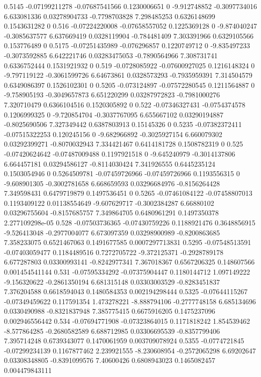 {0.5145 -0.07199211278 -0.07687541566 0.1230006651 0 -9.912748852 -0.3097734016 6.633081336 0.03278904733 -0.7798703828 7.298485253 0.6326148699 0.1543631282 0
0.516 -0.07224220008 -0.07658557052 0.1225369128 0 -9.874040247 -0.3085637577 6.637669419 0.0328119904 -0.784481409 7.303391966 0.6329105566 0.153776489 0
0.5175 -0.07251435989 -0.076296857 0.1220749712 0 -9.835497233 -0.3073592885 6.642221746 0.03283475053 -0.7890564966 7.308731741 0.6336752444 0.1531921932 0
0.519 -0.0728085922 -0.07600927025 0.1216148324 0 -9.797119122 -0.3061599726 6.64673861 0.0328573293 -0.7935959391 7.314504579 0.6349086397 0.1526102301 0
0.5205 -0.073124897 -0.07572280545 0.1211564887 0 -9.758905193 -0.3049657873 6.651220299 0.03287972823 -0.7981000276 7.320710479 0.6366104516 0.1520305892 0
0.522 -0.07346327431 -0.0754374578 0.1206999325 0 -9.720854704 -0.3037767095 6.655667102 0.03290194887 -0.8025690506 7.327349442 0.6387803913 0.15145326 0
0.5235 -0.07382372411 -0.07515322253 0.120245156 0 -9.682966892 -0.3025927154 6.660079302 0.03292399271 -0.8070032943 7.334421467 0.6414181728 0.1508782319 0
0.525 -0.07420624642 -0.07487009488 0.1197921518 0 -9.645240979 -0.3014137806 6.664457181 0.03294586127 -0.8114030424 7.341926555 0.6445235124 0.1503054946 0
0.5264509781 -0.07459726966 -0.07459726966 0.1193556315 0 -9.608901305 -0.3002781658 6.668659593 0.03296684976 -0.8156264428 7.349598431 0.6479719879 0.1497536451 0
0.5265 -0.07461084122 -0.07458807013 0.1193409122 0.01138554649 -9.607629717 -0.3002384287 6.66880102 0.03296755604 -0.8157685757 7.349864705 0.6480961291 0.1497350378 2.277109298e-05
0.528 -0.07503736365 -0.07430759226 0.1188921476 0.3648856915 -9.526413048 -0.2977004077 6.673097359 0.03298900989 -0.8200863685 7.358233075 0.6521467063 0.1491677585 0.0007297713831
0.5295 -0.07548513591 -0.07403059477 0.1184489516 0.7272705722 -9.372125371 -0.2928789178 6.677287803 0.03300993141 -0.8242977341 7.367018367 0.6567206325 0.148607566 0.001454541144
0.531 -0.07595334292 -0.07375904447 0.1180144712 1.097149222 -9.156320622 -0.2861350194 6.681315148 0.03303003529 -0.8283451837 7.376204588 0.6618594043 0.1480584353 0.002194298444
0.5325 -0.07644115267 -0.07349459622 0.117591354 1.473278221 -8.888794106 -0.2777748158 6.685134696 0.0330490988 -0.8321837948 7.385775415 0.6675916205 0.1475237096 0.002946556442
0.534 -0.07694771908 -0.07323864015 0.1171818242 1.854539462 -8.577864285 -0.2680582589 6.688712985 0.03306695539 -0.8357799406 7.395714248 0.6739343077 0.1470061959 0.003709078924
0.5355 -0.0774721845 -0.07299234139 0.1167877462 2.239921555 -8.230608954 -0.2572065298 6.69202647 0.03308348805 -0.8391099576 7.40600426 0.6808943023 0.1465082457 0.004479843111
}
